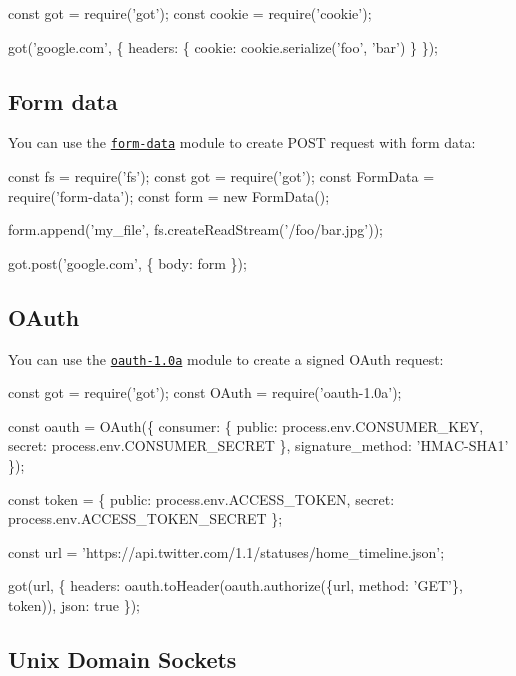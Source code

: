 \begin{DoxyCode}
const got = require('got');
const cookie = require('cookie');

got('google.com', \{
    headers: \{
        cookie: cookie.serialize('foo', 'bar')
    \}
\});
\end{DoxyCode}


\subsection*{Form data}

You can use the \href{https://github.com/form-data/form-data}{\tt {\ttfamily form-\/data}} module to create P\+O\+ST request with form data\+:


\begin{DoxyCode}
const fs = require('fs');
const got = require('got');
const FormData = require('form-data');
const form = new FormData();

form.append('my\_file', fs.createReadStream('/foo/bar.jpg'));

got.post('google.com', \{
    body: form
\});
\end{DoxyCode}


\subsection*{O\+Auth}

You can use the \href{https://github.com/ddo/oauth-1.0a}{\tt {\ttfamily oauth-\/1.\+0a}} module to create a signed O\+Auth request\+:


\begin{DoxyCode}
const got = require('got');
const OAuth = require('oauth-1.0a');

const oauth = OAuth(\{
    consumer: \{
        public: process.env.CONSUMER\_KEY,
        secret: process.env.CONSUMER\_SECRET
    \},
    signature\_method: 'HMAC-SHA1'
\});

const token = \{
    public: process.env.ACCESS\_TOKEN,
    secret: process.env.ACCESS\_TOKEN\_SECRET
\};

const url = 'https://api.twitter.com/1.1/statuses/home\_timeline.json';

got(url, \{
    headers: oauth.toHeader(oauth.authorize(\{url, method: 'GET'\}, token)),
    json: true
\});
\end{DoxyCode}


\subsection*{Unix Domain Sockets}

